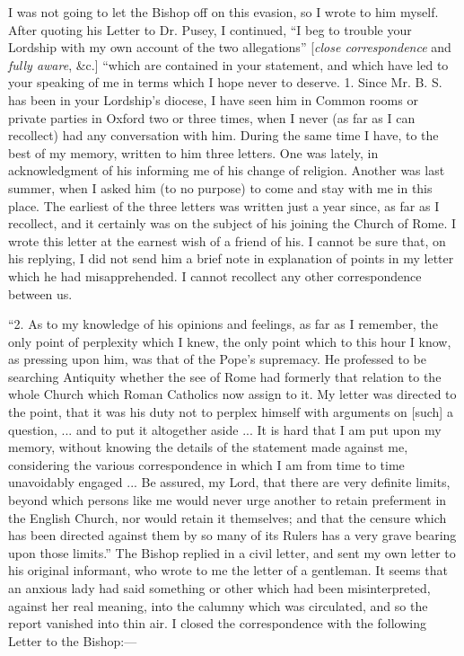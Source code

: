I was not going to let the Bishop off on this evasion, so I wrote to
him myself. After quoting his Letter to Dr. Pusey, I continued, ``I
beg to trouble your Lordship with my own account of the two allegations'' [\emph{close correspondence} and \emph{fully aware}, \&c.] ``which are contained in your statement, and which have
led to your speaking of me in terms which I hope never to deserve. 1.
Since Mr. B. S. has been in your Lordship's diocese, I have seen him in
Common rooms or private parties in Oxford two or three times,
when I never (as far as I can recollect) had any conversation
with him. During the same time I have, to the best of my memory, written
to him three letters. One was lately, in acknowledgment of his informing
me of his change of religion. Another was last summer, when I
asked him (to no purpose) to come and stay with me in this place. The
earliest of the three letters was written just a year since, as far as I
recollect, and it certainly was on the subject of his joining the Church
of Rome. I wrote this letter at the earnest wish of a friend of his. I
cannot be sure that, on his replying, I did not send him a brief note in
explanation of points in my letter which he had misapprehended. I cannot
recollect any other correspondence between us.

``2. As to my knowledge of his opinions and feelings, as far as I
remember, the only point of perplexity which I knew, the only point
which to this hour I know, as pressing upon him, was that of the Pope's
supremacy. He professed to be searching Antiquity whether the see of
Rome had formerly that relation to the whole Church which
Roman Catholics now assign to it. My letter was directed to the point,
that it was his duty not to perplex himself with arguments on [such] a question, ... and to put it altogether aside ... It is hard
that I am put upon my memory, without knowing the details of the
statement made against me, considering the various correspondence in
which I am from time to time unavoidably engaged ... Be assured, my
Lord, that there are very definite limits, beyond which persons like me
would never urge another to retain preferment in the English Church, nor
would retain it themselves; and that the censure which has been directed
against them by so many of its Rulers has a very grave bearing upon
those limits.'' The Bishop replied in a civil letter, and sent my
own letter to his original informant, who wrote to me the letter of a
gentleman. It seems that an anxious lady had said something or other
which had been misinterpreted, against her real meaning, into the
calumny which was circulated, and so the report vanished into thin air.
I closed the correspondence with the following Letter to the Bishop:—

